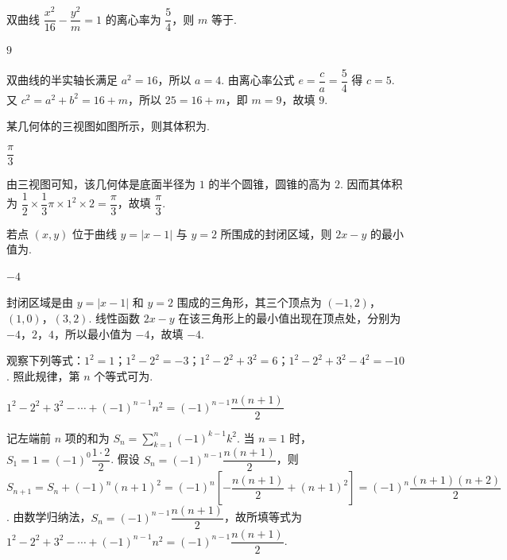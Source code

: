 \begin{problem}
双曲线 \(\dfrac{x^2}{16}-\dfrac{y^2}{m}=1\) 的离心率为 \(\dfrac54\)，则 \(m\) 等于\fillinblank{}.

\begin{answer}
\(9\)
\end{answer}

\begin{solution}
双曲线的半实轴长满足 \(a^2=16\)，所以 \(a=4\). 由离心率公式 \(e=\dfrac ca=\dfrac54\) 得 \(c=5\). 又 \(c^2=a^2+b^2=16+m\)，所以 \(25=16+m\)，即 \(m=9\)，故填 \(9\).
\end{solution}
\end{problem}

\begin{problem}
某几何体的三视图如图所示，则其体积为\fillinblank{}.


\begin{answer}
\(\dfrac{\pi}{3}\)
\end{answer}

\begin{solution}
由三视图可知，该几何体是底面半径为 \(1\) 的半个圆锥，圆锥的高为 \(2\). 因而其体积为 \(\dfrac12\times\dfrac13\pi\times1^2\times2=\dfrac\pi3\)，故填 \(\dfrac\pi3\).
\end{solution}
\end{problem}

\begin{problem}
若点 \((x,y)\) 位于曲线 \(y=\left|x-1\right|\) 与 \(y=2\) 所围成的封闭区域，则 \(2x-y\) 的最小值为\fillinblank{}.

\begin{answer}
\(-4\)
\end{answer}

\begin{solution}
封闭区域是由 \(y=\left|x-1\right|\) 和 \(y=2\) 围成的三角形，其三个顶点为 \((-1,2)\)，\((1,0)\)，\((3,2)\). 线性函数 \(2x-y\) 在该三角形上的最小值出现在顶点处，分别为 \(-4\)，\(2\)，\(4\)，所以最小值为 \(-4\)，故填 \(-4\).
\end{solution}
\end{problem}

\begin{problem}
观察下列等式：\(1^2=1\)；\(1^2-2^2=-3\)；\(1^2-2^2+3^2=6\)；\(1^2-2^2+3^2-4^2=-10\). 照此规律，第 \(n\) 个等式可为\fillinblank{}.

\begin{answer}
\(1^2-2^2+3^2-\cdots+(-1)^{n-1}n^2=(-1)^{n-1}\dfrac{n(n+1)}{2}\)
\end{answer}

\begin{solution}
记左端前 \(n\) 项的和为 \(S_n=\sum_{k=1}^{n}(-1)^{k-1}k^2\). 当 \(n=1\) 时，\(S_1=1=(-1)^0\dfrac{1\cdot2}{2}\). 假设 \(S_n=(-1)^{n-1}\dfrac{n(n+1)}{2}\)，则 \(S_{n+1}=S_n+(-1)^n(n+1)^2=(-1)^n\left[-\dfrac{n(n+1)}2+(n+1)^2\right]=(-1)^n\dfrac{(n+1)(n+2)}2\). 由数学归纳法，\(S_n=(-1)^{n-1}\dfrac{n(n+1)}2\)，故所填等式为 \(1^2-2^2+3^2-\cdots+(-1)^{n-1}n^2=(-1)^{n-1}\dfrac{n(n+1)}2\).
\end{solution}
\end{problem}

